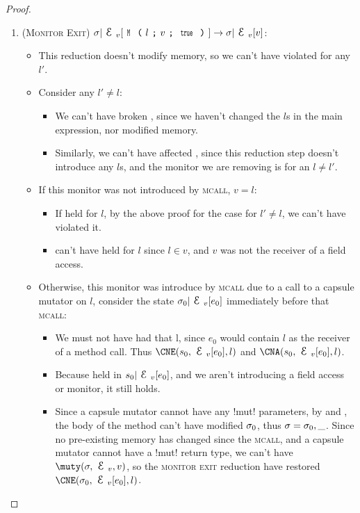 \begin{proof}
\begin{enumerate}
\item (\textsc{Monitor Exit}) $\sigma|\EV[\M{l}{v}{\Kw{true}}]\rightarrow \sigma|\EV[v]$:
\begin{itemize}
\item This reduction doesn't modify memory, so we can't have violated \CNC for any $l'$.
\item Consider any $l' \neq l$:
\begin{itemize}
\item We can't have broken \CNE, since we haven't changed the $l$s in the main expression, nor modified memory.
\item Similarly, we can't have affected \CNO, since this reduction step doesn't introduce any $l$s, and the monitor we are removing is for an $l \neq l'$.
\end{itemize}
\item If this monitor was not introduced by \textsc{mcall}, $v = l$:
\begin{itemize}
\item If \CNE held for $l$, by the above proof for the case for $l' \neq l$, we can't have violated it.
\item \CNO can't have held for $l$ since $l \in v$, and $v$ was not the receiver of a field access.
\end{itemize}

\item Otherwise, this monitor was introduce by \textsc{mcall} due to a call to a capsule mutator on $l$, consider the state $\s_0|\EV[e_0]$ immediately before that \textsc{mcall}:
\begin{itemize}
\item We must not have had that \CNO l, since $e_0$ would contain $l$ as the receiver of a method call. Thus $\CNE(s_0, \EV[e_0], l)$ and $\CNA(s_0, \EV[e_0], l)$. 
\item Because \CNA held in $s_0|\EV[e_0]$, and we aren't introducing a field access or monitor, it still holds.
\item Since a capsule mutator cannot have any \Q!mut! parameters, by  and , the body of the method can't have modified $\sigma_0$, thus $\sigma = \sigma_0, \_$. Since no pre-existing memory has changed since the \textsc{mcall}, and a capsule mutator cannot have a \Q!mut! return type, we can't have $\muty(\s, \EV, v)$, so the \textsc{monitor exit} reduction have restored $\CNE(\s_0, \EV[e_0], l)$.
\end{itemize}
\end{itemize}


\end{enumerate}
\end{proof}
